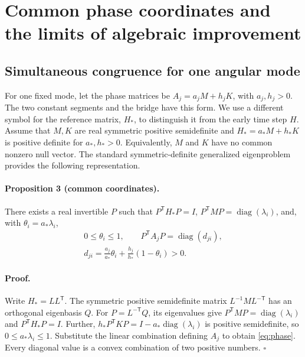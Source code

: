 \section{Common phase coordinates and the limits of algebraic improvement}
\label{sec:phase-analysis}

\subsection{Simultaneous congruence for one angular mode}

For one fixed mode, let the phase matrices be
\(A_j=a_jM+h_jK\), with \(a_j,h_j>0\). The two constant segments
and the bridge have this form. We use a different symbol for the
reference matrix, \(H_*\), to distinguish it from the early time
step \(H\). Assume that \(M,K\) are real symmetric positive
semidefinite and
\(H_*=a_*M+h_*K\) is positive definite for \(a_*,h_*>0\).
Equivalently, \(M\) and \(K\) have no common nonzero null vector.
The standard symmetric-definite generalized eigenproblem
\cite{r10} provides the following representation.

\paragraph{Proposition 3 (common coordinates).}
There exists a real invertible \(P\) such that
\(P^{\mathsf T}H_*P=I\),
\(P^{\mathsf T}MP=\operatorname{diag}(\lambda_i)\), and, with
\(\theta_i=a_*\lambda_i\),
\begin{equation}
 \begin{gathered}
 0\leq\theta_i\leq1,\qquad
 P^{\mathsf T}A_jP=\operatorname{diag}(d_{ji}),\\
 d_{ji}=\frac{a_j}{a_*}\theta_i+
             \frac{h_j}{h_*}(1-\theta_i)>0.
 \end{gathered}
 \label{eq:phase}
\end{equation}

\paragraph{Proof.}
Write \(H_*=LL^{\mathsf T}\). The symmetric positive
semidefinite matrix \(L^{-1}ML^{-\mathsf T}\) has an orthogonal
eigenbasis \(Q\). For \(P=L^{-\mathsf T}Q\), its eigenvalues
give \(P^{\mathsf T}MP=\operatorname{diag}(\lambda_i)\) and
\(P^{\mathsf T}H_*P=I\). Further,
\(h_*P^{\mathsf T}KP=I-a_*\operatorname{diag}(\lambda_i)\)
is positive semidefinite, so \(0\leq a_*\lambda_i\leq1\).
Substitute the linear combination defining \(A_j\) to obtain
\eqref{eq:phase}. Every diagonal value is a convex combination of
two positive numbers. \hfill\(\square\)

